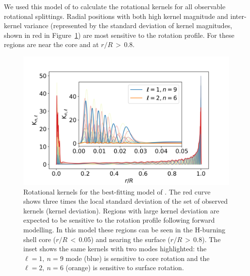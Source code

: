 
We used this model of \thestar{} to calculate the rotational kernels for all observable rotational splittings. Radial positions with both high kernel magnitude and inter-kernel variance (represented by the standard deviation of kernel magnitudes, shown in red in Figure~\ref{fig:kern}) are most sensitive to the rotation profile. For \thestar{} these regions are near the core and at $r/R \, > \,0.8$.

\begin{figure}
    \includegraphics[width=\textwidth]{Figures/subgiant_chapter_figures/staradif.png}
    \caption[Rotational kernels for the best-fitting model of KIC~12508433.]{Rotational kernels for the best-fitting model of \thestar{}. The red curve shows three times the local standard deviation of the set of observed kernels (kernel deviation). Regions with large kernel deviation are expected to be sensitive to the rotation profile following forward modelling. In this model these regions can be seen in the H-burning shell core ($r/R \, < \, 0.05$) and nearing the surface ($r/R \, > \, 0.8$). The inset shows the same kernels with two modes highlighted: the $\ell = 1,\ n=9$ mode (blue) is sensitive to core rotation and the $\ell = 2,\ n = 6$ (orange) is sensitive to surface rotation.}
    \label{fig:kern}
\end{figure}


